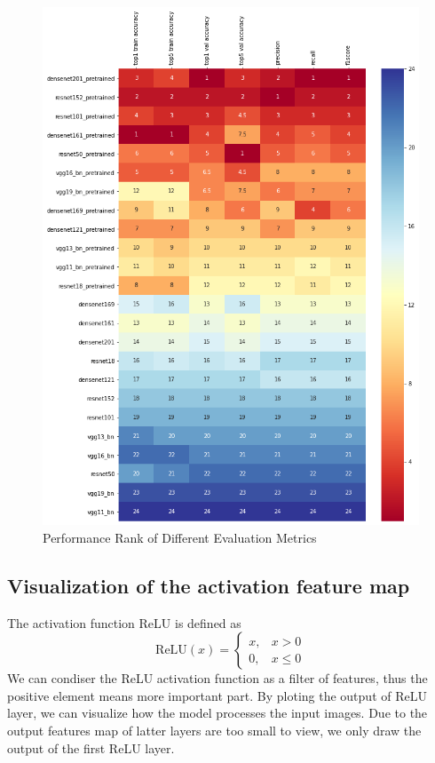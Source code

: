 \begin{figure}[ht]
  \centering
  \includegraphics[width=\linewidth]{figs/rank.png}
  \caption{Performance Rank of Different Evaluation Metrics}
  \label{fig:rank}
\end{figure}

\subsection{Visualization of the activation feature map}
The activation function ReLU is defined as
\begin{equation}
  \text{ReLU}(x)=\left\{
  \begin{array}{lr}
    x, & x > 0    \\
    0, & x \leq 0
  \end{array}
  \right.
\end{equation}
We can condiser the ReLU activation function as a filter of features, thus the positive element means more important part.
By ploting the output of ReLU layer, we can visualize how the model processes the input images.
Due to the output features map of latter layers are too small to view, we only draw the output of the first ReLU layer.


